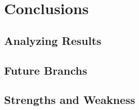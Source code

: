 \documentclass[11pt, oneside]{book} %
\begin{document}
\chapter{Conclusions} \label{chap:c6_conclusions}
\section{Analyzing Results}
\section{Future Branchs}
\section{Strengths and Weakness}

\listoffigures{}
\end{document}
